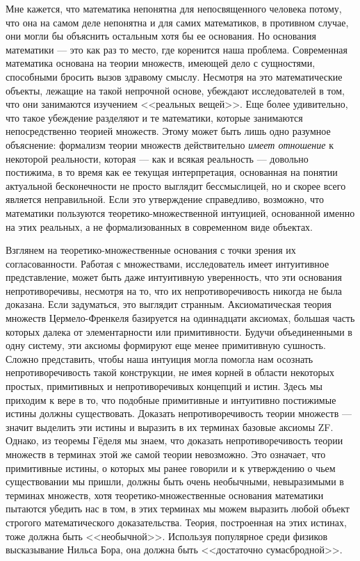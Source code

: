 Мне кажется, что математика непонятна для непосвященного человека потому, что она на самом деле непонятна и для самих математиков, в противном случае, они могли бы объяснить остальным хотя бы ее основания. Но основания математики --- это как раз то место, где коренится наша проблема. Современная математика основана на теории множеств, имеющей дело с сущностями, способными бросить вызов здравому смыслу. Несмотря на это математические объекты, лежащие на такой непрочной основе, убеждают исследователей в том, что они занимаются изучением <<реальных вещей>>. Еще более удивительно, что такое убеждение разделяют и те математики, которые занимаются непосредственно теорией множеств. Этому может быть лишь одно разумное объяснение: формализм теории множеств действительно \textit{имеет отношение} к некоторой реальности, которая --- как и всякая реальность --- довольно постижима, в то время как ее текущая интерпретация, основанная на понятии актуальной бесконечности не просто выглядит бессмыслицей, но и скорее всего является неправильной. Если это утверждение справедливо, возможно, что математики пользуются теоретико-множественной интуицией, основанной именно на этих реальных, а не формализованных в современном виде объектах.

Взглянем на теоретико-множественные основания с точки зрения их согласованности. Работая с множествами, исследователь имеет интуитивное представление, может быть даже интуитивную уверенность, что эти основания непротиворечивы, несмотря на то, что их непротиворечивость никогда не была доказана. Если задуматься, это выглядит странным. Аксиоматическая теория множеств Цермело-Френкеля базируется на одиннадцати аксиомах, большая часть которых далека от элементарности или примитивности. Будучи объединенными в одну систему, эти аксиомы формируют еще менее примитивную сушность. Сложно представить, чтобы наша интуиция могла помогла нам осознать непротиворечивость такой конструкции, не имея корней в области некоторых простых, примитивных и непротиворечивых концепций и истин. Здесь мы приходим к вере в то, что подобные примитивные и интуитивно постижимые истины должны существовать. Доказать непротиворечивость теории множеств --- значит выделить эти истины и выразить в их терминах базовые аксиомы ZF. Однако, из теоремы Гёделя мы знаем, что доказать непротиворечивость теории множеств в терминах этой же самой теории невозможно. Это означает, что примитивные истины, о которых мы ранее говорили и к утверждению о чьем существовании мы пришли, должны быть очень необычными, невыразимыми в терминах множеств, хотя теоретико-множественные основания математики пытаются убедить нас в том, в этих терминах мы можем выразить любой объект строгого математического доказательства. Теория, построенная на этих истинах, тоже должна быть <<необычной>>. Используя популярное среди физиков высказывание Нильса Бора, она должна быть <<достаточно сумасбродной>>.

